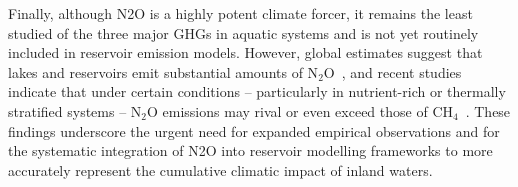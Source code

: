 \documentclass[review, authoryear, 1p]{elsarticle} %
\begin{document}
Finally, although \acf{N2O} is a highly potent climate forcer, it remains the least studied of the three major \acp{GHG} in aquatic systems and is not yet routinely included in reservoir emission models.
However, global estimates suggest that lakes and reservoirs emit substantial amounts of N$_2$O~\cite{Li2024}, and recent studies indicate that under certain conditions -- particularly in nutrient-rich or thermally stratified systems -- N$_2$O emissions may rival or even exceed those of CH$_4$~\cite{Chen2025}.
These findings underscore the urgent need for expanded empirical observations and for the systematic integration of \ac{N2O} into reservoir modelling frameworks to more accurately represent the cumulative climatic impact of inland waters.

\end{document}
